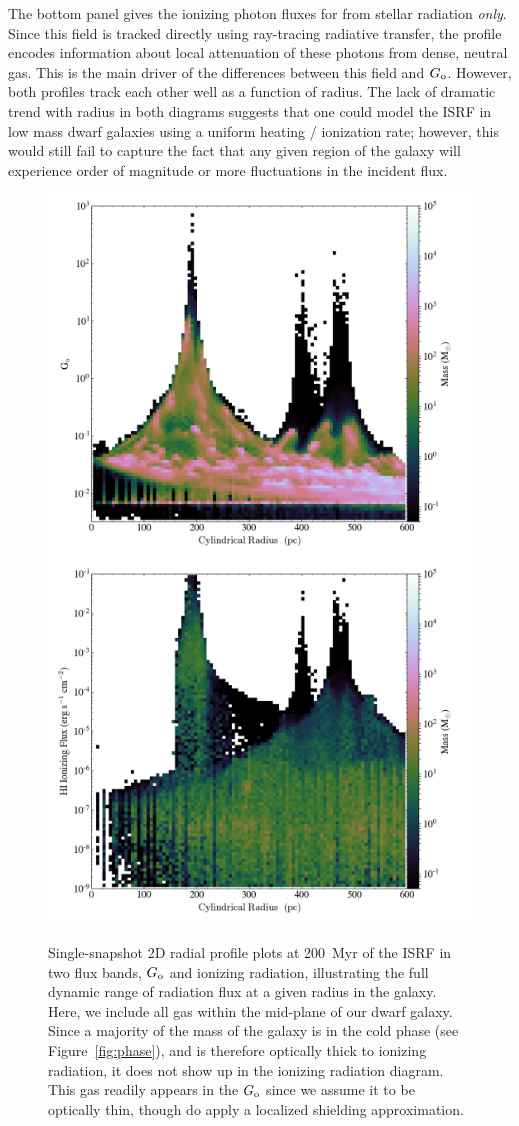 \documentclass[twocolumn]{aastex61}
\begin{document}
\begin{figure}
\label{fig:ISRF}
\end{figure}

The bottom panel gives the ionizing photon fluxes for  from stellar radiation {\em only}. Since this field is tracked directly using ray-tracing radiative transfer, the profile encodes information about local attenuation of these photons from dense, neutral gas. This is the main driver of the differences between this field and $G_{\rm o}$. However, both profiles track each other well as a function of radius. The lack of dramatic trend with radius in both diagrams suggests that one could model the ISRF in low mass dwarf galaxies using a uniform heating / ionization rate; however, this would still fail to capture the fact that any given region of the galaxy will experience order of magnitude or more fluctuations in the incident flux. 

\begin{figure}
\centering
\includegraphics[width=0.45\linewidth]{g_o_2D_phase}
\includegraphics[width=0.45\linewidth]{q_o_2D_phase}
\caption{Single-snapshot 2D radial profile plots at 200~Myr of the ISRF in two flux bands, $G_{\rm o}$ and  ionizing radiation, illustrating the full dynamic range of radiation flux at a given radius in the galaxy. Here, we include all gas within the mid-plane of our dwarf galaxy. Since a majority of the mass of the galaxy is in the cold phase (see Figure~\ref{fig:phase}), and is therefore optically thick to  ionizing radiation, it does not show up in the  ionizing radiation diagram. This gas readily appears in the $G_{\rm o}$ since we assume it to be optically thin, though do apply a localized shielding approximation.}
\label{fig:ISRF_2D}
\end{figure}
\end{document}
